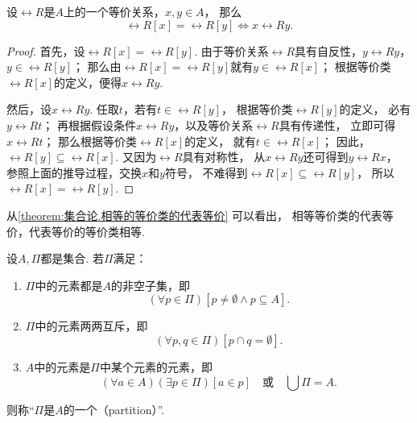 \begin{lemma}\label{theorem:集合论.相等的等价类的代表等价}
设\(\rel{R}\)是\(A\)上的一个等价关系，\(x,y \in A\)，
那么\[
	\rel{R}[x] = \rel{R}[y]
	\iff
	x \rel{R} y.
\]
\begin{proof}
首先，设\(\rel{R}[x] = \rel{R}[y]\).
由于等价关系\(\rel{R}\)具有自反性，\(y \rel{R} y\)，\(y \in \rel{R}[y]\)；
那么由\(\rel{R}[x] = \rel{R}[y]\)就有\(y \in \rel{R}[x]\)；
根据等价类\(\rel{R}[x]\)的定义，便得\(x \rel{R} y\).

然后，设\(x \rel{R} y\).
任取\(t\)，若有\(t \in \rel{R}[y]\)，
根据等价类\(\rel{R}[y]\)的定义，
必有\(y \rel{R} t\)；
再根据假设条件\(x \rel{R} y\)，以及等价关系\(\rel{R}\)具有传递性，
立即可得\(x \rel{R} t\)；
那么根据等价类\(\rel{R}[x]\)的定义，
就有\(t \in \rel{R}[x]\)；
因此，\(\rel{R}[y] \subseteq \rel{R}[x]\).
又因为\(\rel{R}\)具有对称性，
从\(x \rel{R} y\)还可得到\(y \rel{R} x\)，
参照上面的推导过程，交换\(x\)和\(y\)符号，
不难得到\(\rel{R}[x] \subseteq \rel{R}[y]\)，
所以\(\rel{R}[x] = \rel{R}[y]\).
\end{proof}
\end{lemma}
从\cref{theorem:集合论.相等的等价类的代表等价} 可以看出，
相等等价类的代表等价，代表等价的等价类相等.

\begin{definition}\label{definition:集合论.划分的定义}
设\(A,\Pi\)都是集合.
若\(\Pi\)满足：
\begin{enumerate}
	\item \(\Pi\)中的元素都是\(A\)的非空子集，即\[
		(\forall p \in \Pi)
		[
			p \neq \emptyset
			\land
			p \subseteq A
		].
	\]

	\item \(\Pi\)中的元素两两互斥，即\[
		(\forall p,q \in \Pi)[p \cap q = \emptyset].
	\]

	\item \(A\)中的元素是\(\Pi\)中某个元素的元素，即\[
		(\forall a \in A)
		(\exists p \in \Pi)
		[a \in p]
		\quad\text{或}\quad
		\bigcup\Pi = A.
	\]
\end{enumerate}
则称“\(\Pi\)是\(A\)的一个（partition）”.
\end{definition}

